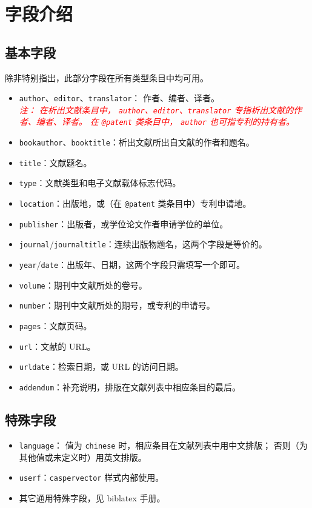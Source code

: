 \documentclass[UTF8]{ctexart}
\newcommand{\myemph}[1]{\emph{\textcolor{red}{#1}}}
\begin{document}
\section{字段介绍}\label{sec:fields}
\subsection{基本字段}

除非特别指出，此部分字段在所有类型条目中均可用。

\begin{itemize}
	\item \verb|author|、\verb|editor|、\verb|translator|：
		作者、编者、译者。\\
		\myemph{%
			注：
			在析出文献条目中，%
			\texttt{author}、\texttt{editor}、\texttt{translator}
			专指析出文献的作者、编者、译者。
			在 \texttt{@patent} 类条目中，%
			\texttt{author} 也可指专利的持有者。%
		}
	\item \verb|bookauthor|、\verb|booktitle|：析出文献所出自文献的作者和题名。
	\item \verb|title|：文献题名。
	\item \verb|type|：文献类型和电子文献载体标志代码\supercite{gbt7714-2005}。
	\item \verb|location|：出版地，或（在 \verb|@patent| 类条目中）专利申请地。
	\item \verb|publisher|：出版者，或学位论文作者申请学位的单位。
	\item \verb|journal|/\verb|journaltitle|：连续出版物题名，这两个字段是等价的。
	\item \verb|year|/\verb|date|：出版年、日期，这两个字段只需填写一个即可。
	\item \verb|volume|：期刊中文献所处的卷号。
	\item \verb|number|：期刊中文献所处的期号，或专利的申请号。
	\item \verb|pages|：文献页码。
	\item \verb|url|：文献的 URL。
	\item \verb|urldate|：检索日期，或 URL 的访问日期。
	\item \verb|addendum|：补充说明，排版在文献列表中相应条目的最后。
\end{itemize}

\subsection{特殊字段}

\begin{itemize}
	\item \verb|language|：
		值为 \verb|chinese| 时，相应条目在文献列表中用中文排版；
		否则（为其他值或未定义时）用英文排版。
	\item \verb|userf|：\verb|caspervector| 样式内部使用。
	\item 其它通用特殊字段，见 biblatex 手册\supercite{biblatex}。
\end{itemize}
\end{document}
